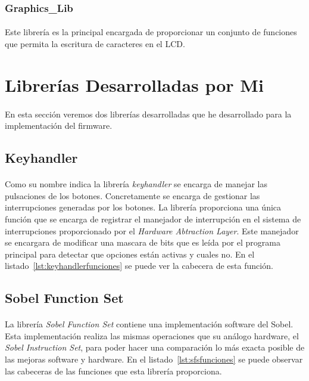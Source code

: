 \documentclass[a4paper,12pt,titlepage,final]{book}
\begin{document}
\subsubsection{Graphics\_Lib}
\paragraph{}
Este librería es la principal encargada de proporcionar un conjunto de funciones que permita la escritura de caracteres en el LCD.

\section{Librerías Desarrolladas por Mi}
\paragraph{}
En esta sección veremos dos librerías desarrolladas que he desarrollado para la implementación del firmware.

\subsection{Keyhandler}
\paragraph{}
Como su nombre indica la librería \textit{keyhandler} se encarga de manejar las pulsaciones de los botones. Concretamente se encarga de gestionar las interrupciones generadas por los botones. La librería proporciona una única función que se encarga de registrar el manejador de interrupción en el sistema de interrupciones proporcionado por el \textit{Hardware Abtraction Layer}. Este manejador se encargara de modificar una mascara de bits que es leída por el programa principal para detectar que opciones están activas y cuales no. En el listado~\ref{lst:keyhandlerfunciones} se puede ver la cabecera de esta función.



\subsection{Sobel Function Set}
\paragraph{}
La librería \textit{Sobel Function Set} contiene una implementación software del Sobel. Esta implementación realiza las mismas operaciones que su análogo hardware, el \textit{Sobel Instruction Set}, para poder hacer una comparación lo más exacta posible de las mejoras software y hardware. En el listado~\ref{lst:sfsfunciones} se puede observar las cabeceras de las funciones que esta librería proporciona.
\end{document}
